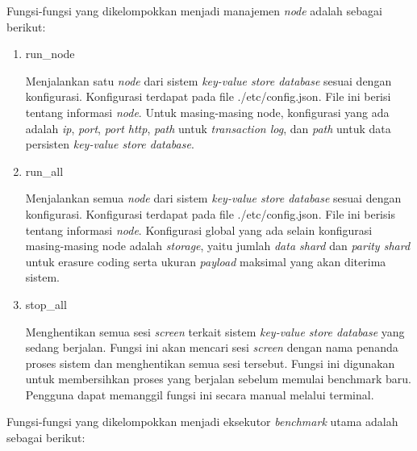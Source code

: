 Fungsi-fungsi yang dikelompokkan menjadi manajemen \textit{node} adalah sebagai berikut:

\begin{enumerate}
	\item run\_node

	      Menjalankan satu \textit{node} dari sistem \textit{key-value store database} sesuai dengan konfigurasi. Konfigurasi terdapat pada file ./etc/config.json. File ini berisi tentang informasi \textit{node}. Untuk masing-masing node, konfigurasi yang ada adalah \textit{ip}, \textit{port}, \textit{port http}, \textit{path} untuk \textit{transaction log}, dan \textit{path} untuk data persisten \textit{key-value store database}.

	\item run\_all

	      Menjalankan semua \textit{node} dari sistem \textit{key-value store database} sesuai dengan konfigurasi. Konfigurasi terdapat pada file ./etc/config.json. File ini berisis tentang informasi \textit{node}. Konfigurasi global yang ada selain konfigurasi masing-masing node adalah \textit{storage}, yaitu jumlah \textit{data shard} dan \textit{parity shard} untuk erasure coding serta ukuran \textit{payload} maksimal yang akan diterima sistem.

	\item stop\_all

	      Menghentikan semua sesi \textit{screen} terkait sistem \textit{key-value store database} yang sedang berjalan. Fungsi ini akan mencari sesi \textit{screen} dengan nama penanda proses sistem dan menghentikan semua sesi tersebut. Fungsi ini digunakan untuk membersihkan proses yang berjalan sebelum memulai benchmark baru. Pengguna dapat memanggil fungsi ini secara manual melalui terminal.
\end{enumerate}

Fungsi-fungsi yang dikelompokkan menjadi eksekutor \textit{benchmark} utama adalah sebagai berikut:

